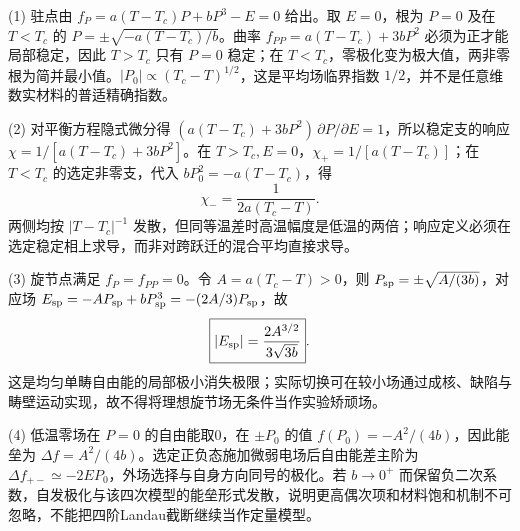 (1) 驻点由 \(f_P=a(T-T_c)P+bP^3-E=0\) 给出。取 \(E=0\)，根为 \(P=0\) 及在 \(T<T_c\) 的 \(P=\pm\sqrt{-a(T-T_c)/b}\)。曲率 \(f_{PP}=a(T-T_c)+3bP^2\) 必须为正才能局部稳定，因此 \(T>T_c\) 只有 \(P=0\) 稳定；在 \(T<T_c\)，零极化变为极大值，两非零根为简并最小值。\(\boxed{|P_0|\propto(T_c-T)^{1/2}}\)，这是平均场临界指数 \(1/2\)，并不是任意维数实材料的普适精确指数。

(2) 对平衡方程隐式微分得
\((a(T-T_c)+3bP^2)\,\partial P/\partial E=1\)，所以稳定支的响应
\(\chi=1/[a(T-T_c)+3bP^2]\)。在 \(T>T_c,E=0\)，\(\chi_+=1/[a(T-T_c)]\)；在 \(T<T_c\) 的选定非零支，代入 \(bP_0^2=-a(T-T_c)\)，得
\[
\boxed{\chi_-=\frac1{2a(T_c-T)}}.
\]
两侧均按 \(|T-T_c|^{-1}\) 发散，但同等温差时高温幅度是低温的两倍；响应定义必须在选定稳定相上求导，而非对跨跃迁的混合平均直接求导。

(3) 旋节点满足 \(f_P=f_{PP}=0\)。令 \(A=a(T_c-T)>0\)，则
\(P_{\rm sp}=\pm\sqrt{A/(3b)}\)，对应场
\(E_{\rm sp}=-AP_{\rm sp}+bP_{\rm sp}^3=-(2A/3)P_{\rm sp}\)，故
\[
\boxed{|E_{\rm sp}|=\frac{2A^{3/2}}{3\sqrt{3b}}}.
\]
这是均匀单畴自由能的局部极小消失极限；实际切换可在较小场通过成核、缺陷与畴壁运动实现，故不得将理想旋节场无条件当作实验矫顽场。

(4) 低温零场在 \(P=0\) 的自由能取0，在 \(\pm P_0\) 的值 \(f(P_0)=-A^2/(4b)\)，因此能垒为 \(\Delta f=A^2/(4b)\)。选定正负态施加微弱电场后自由能差主阶为 \(\Delta f_{+-}\simeq-2EP_0\)，外场选择与自身方向同号的极化。若 \(b\to0^+\) 而保留负二次系数，自发极化与该四次模型的能垒形式发散，说明更高偶次项和材料饱和机制不可忽略，不能把四阶Landau截断继续当作定量模型。
